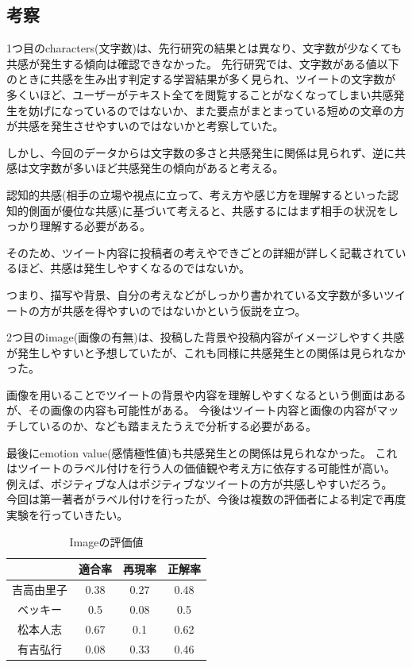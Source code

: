 \documentclass[dvipdfmx]{issj}
\begin{document}
\subsection{考察}  %
1つ目のcharacters(文字数)は、先行研究の結果とは異なり、文字数が少なくても共感が発生する傾向は確認できなかった。
先行研究では、文字数がある値以下のときに共感を生み出す判定する学習結果が多く見られ、ツイートの文字数が多くいほど、ユーザーがテキスト全てを閲覧することがなくなってしまい共感発生を妨げになっているのではないか、また要点がまとまっている短めの文章の方が共感を発生させやすいのではないかと考察していた。

しかし、今回のデータからは文字数の多さと共感発生に関係は見られず、逆に共感は文字数が多いほど共感発生の傾向があると考える。

認知的共感(相手の立場や視点に立って、考え方や感じ方を理解するといった認知的側面が優位な共感)に基づいて考えると、共感するにはまず相手の状況をしっかり理解する必要がある。

そのため、ツイート内容に投稿者の考えやできごとの詳細が詳しく記載されているほど、共感は発生しやすくなるのではないか。

つまり、描写や背景、自分の考えなどがしっかり書かれている文字数が多いツイートの方が共感を得やすいのではないかという仮説を立つ。


2つ目のimage(画像の有無)は、投稿した背景や投稿内容がイメージしやすく共感が発生しやすいと予想していたが、これも同様に共感発生との関係は見られなかった。

画像を用いることでツイートの背景や内容を理解しやすくなるという側面はあるが、その画像の内容も可能性がある。
今後はツイート内容と画像の内容がマッチしているのか、なども踏まえたうえで分析する必要がある。


最後にemotion value(感情極性値)も共感発生との関係は見られなかった。
これはツイートのラベル付けを行う人の価値観や考え方に依存する可能性が高い。
例えば、ポジティブな人はポジティブなツイートの方が共感しやすいだろう。
今回は第一著者がラベル付けを行ったが、今後は複数の評価者による判定で再度実験を行っていきたい。

\begin{table}[t]
  \begin{center}
    \caption{Imageの評価値}
    \begin{tabular}{c|ccc} \hline \hline
& 適合率 & 再現率 & 正解率 \\ \hline \hline
吉高由里子 &0.38&0.27&0.48 \\ \hline
ベッキー &0.5&0.08&0.5\\ \hline
松本人志 &0.67&0.1&0.62 \\ \hline
有吉弘行 & 0.08&0.33&0.46 \\ \hline
    \end{tabular}
    \label{tab:tripcode_user}
  \end{center}
\end{table}
\end{document}
